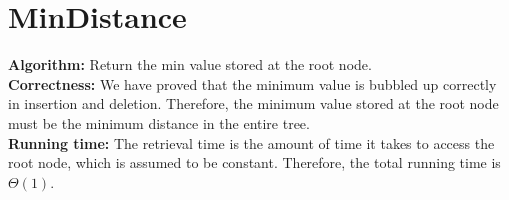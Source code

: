 \documentclass[12pt]{article}
\begin{document}
\section*{MinDistance}
\textbf{Algorithm:} Return the min value stored at the root node.\\
\textbf{Correctness:} We have proved that the minimum value is bubbled up correctly in insertion and deletion. Therefore, the minimum value stored at the root node must be the minimum distance in the entire tree.\\
\textbf{Running time:} The retrieval time is the amount of time it takes to access the root node, which is assumed to be constant. Therefore, the total running time is $\Theta(1)$.\\
\end{document}
